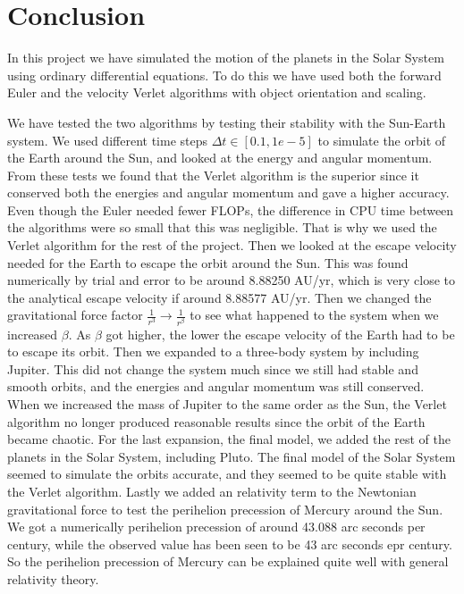 \documentclass[12pt,a4paper,english]{article}
\begin{document}
\newpage
\section{Conclusion}
\label{sect:Conclusion}
In this project we have simulated the motion of the planets in the Solar System using ordinary differential equations. To do this we have used both the forward Euler and the velocity Verlet algorithms with object orientation and scaling. 

We have tested the two algorithms by testing their stability with the Sun-Earth system. We used different time steps $\Delta t\in[0.1,1e-5]$ to simulate the orbit of the Earth around the Sun, and looked at the energy and angular momentum. From these tests we found that the Verlet algorithm is the superior since it conserved both the energies and angular momentum and gave a higher accuracy. Even though the Euler needed fewer FLOPs, the difference in CPU time between the algorithms were so small that this was negligible. That is why we used the Verlet algorithm for the rest of the project. Then we looked at the escape velocity needed for the Earth to escape the orbit around the Sun. This was found numerically by trial and error to be around 8.88250 AU/yr, which is very close to the analytical escape velocity if around 8.88577 AU/yr. Then we changed the gravitational force factor $\frac{1}{r^3}\rightarrow\frac{1}{r^{\beta}}$ to see what happened to the system when we increased $\beta$. As $\beta$ got higher, the lower the escape velocity of the Earth had to be to escape its orbit. Then we expanded to a three-body system by including Jupiter. This did not change the system much since we still had stable and smooth orbits, and the energies and angular momentum was still conserved. When we increased the mass of Jupiter to the same order as the Sun, the Verlet algorithm no longer produced reasonable results since the orbit of the Earth became chaotic. For the last expansion, the final model, we added the rest of the planets in the Solar System, including Pluto. The final model of the Solar System seemed to simulate the orbits accurate, and they seemed to be quite stable with the Verlet algorithm. Lastly we added an relativity term to the Newtonian gravitational force to test the perihelion precession of Mercury around the Sun. We got a numerically perihelion precession of around 43.088 arc seconds per century, while the observed value has been seen to be 43 arc seconds epr century. So the perihelion precession of Mercury can be explained quite well with general relativity theory.
\end{document}
